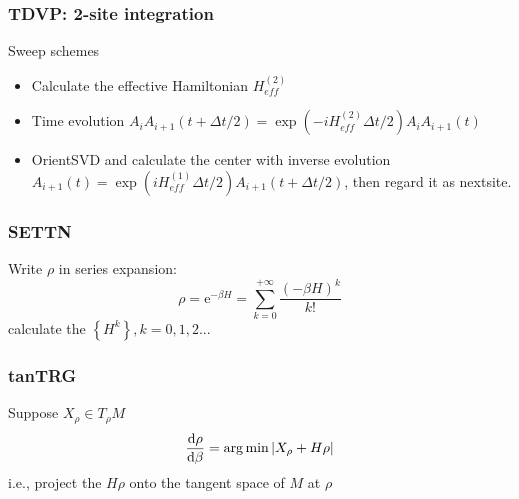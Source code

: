 \documentclass{beamer}
\begin{document}
\begin{frame}
	\frametitle{TDVP: 2-site integration}
	Sweep schemes
	\begin{itemize}
		\item Calculate the effective Hamiltonian $H_{eff}^{(2)}$
		\item Time evolution $A_iA_{i+1}(t+\Delta t/2) = \exp(-iH_{eff}^{(2)}\Delta t / 2)A_iA_{i+1}(t)$ 
		\item OrientSVD and calculate the center with inverse evolution $A_{i+1}(t) = \exp(iH_{eff}^{(1)}\Delta t /2) A_{i+1}(t+\Delta t/2)$, then regard it as nextsite.
		\begin{figure}[H]
			\centering
			\subfigbottomskip=2pt
			\subfigcapskip=-5pt
		\end{figure}
	\end{itemize}
\end{frame}

\begin{frame}
	\frametitle{SETTN}
	Write $\rho$ in series expansion:
	\begin{equation}
		\rho  = \mathrm{e}^{-\beta H} = \sum_{k=0}^{+\infty} \frac{(-\beta H)^k}{k!}
	\end{equation}
	calculate the $\left\{ H^k \right\},k=0,1,2...$
\end{frame}

\begin{frame}
	\frametitle{tanTRG}
	Suppose $X_\rho\in T_\rho M$
	\begin{equation}
		\dv{\rho}{\beta} = \arg \min \abs{X_\rho + H\rho}
	\end{equation}
	i.e., project the $ H\rho$ onto the tangent space of $M$ at $\rho$
\end{frame}
\end{document}
